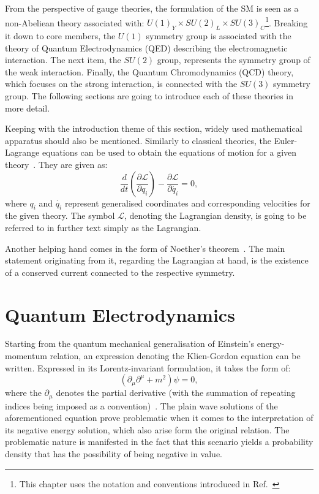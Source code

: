 \hspace{10pt} From the perspective of gauge theories, the formulation of the SM is seen as a non-Abeliean theory associated with: $U(1)_Y \times SU(2)_L \times  SU(3)_C$\footnote{This chapter uses the notation and conventions introduced in Ref.~\cite{thomson_2013}}. Breaking it down to core members, the $U(1)$ symmetry group is associated with the theory of Quantum Electrodynamics (QED) describing the electromagnetic interaction. The next item, the $SU(2)$ group, represents the symmetry group of the weak interaction. Finally, the Quantum Chromodynamics (QCD) theory, which focuses on the strong interaction, is connected with the $SU(3)$ symmetry group. The following sections are going to introduce each of these theories in more detail. 

\hspace{10pt} Keeping with the introduction theme of this section, widely used mathematical apparatus should also be mentioned. Similarly to classical theories, the Euler-Lagrange equations can be used to obtain the equations of motion for a given theory~\cite{book:fox}. They are given as:
\begin{equation}
    \frac{d}{dt}\left ( \frac{\partial \mathcal{L}}{\partial q_i } \right ) - \frac{\partial \mathcal{L}}{\partial \dot{q_i}} =0,
\end{equation}
where $q_i$ and $\dot{q_i}$ represent generalised coordinates and corresponding velocities for the given theory. The symbol $\mathcal{L}$, denoting the Lagrangian density, is going to be referred to in further text simply as the Lagrangian.

\hspace{10pt} Another helping hand comes in the form of Noether's theorem~\cite{paper:noether}. The main statement originating from it, regarding the Lagrangian at hand, is the existence of a conserved current connected to the respective symmetry. 

\section{Quantum Electrodynamics}
\hspace{10pt} Starting from the quantum mechanical generalisation of Einstein's energy-momentum relation, an expression denoting the Klien-Gordon equation can be written. Expressed in its Lorentz-invariant formulation, it takes the form of:
\begin{equation}
    (\partial_{\mu}\partial^{\mu}+m^2)\psi = 0,
\end{equation}
where the $\partial_\mu$ denotes the partial derivative (with the summation of repeating indices being imposed as a convention)~\cite{thomson_2013,book:schwartz}. The plain wave solutions of the aforementioned equation prove problematic when it comes to the interpretation of its negative energy solution, which also arise form the original relation. The problematic nature is manifested in the fact that this scenario yields a probability density that has the possibility of being negative in value.

